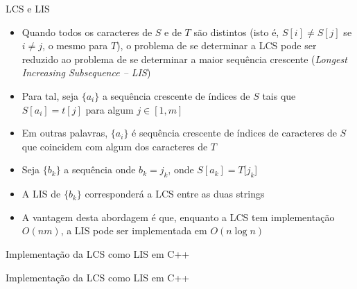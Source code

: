 \begin{frame}[fragile]{LCS e LIS}

    \begin{itemize}
        \item Quando todos os caracteres de $S$ e de $T$ são distintos (isto é, 
            $S[i] \neq S[j]$ se $i \neq j$, o mesmo para $T$), o problema de se determinar a LCS 
            pode ser reduzido ao problema de se determinar a maior sequência crescente 
            (\textit{Longest Increasing Subsequence -- LIS})

        \item Para tal, seja $\lbrace a_i\rbrace$ a sequência crescente de índices de $S$ tais que
            $S[a_i] = t[j]$ para algum $j\in [1,m]$

        \item Em outras palavras, $\lbrace a_i\rbrace$ é sequência crescente de índices de 
            caracteres de $S$ que coincidem com algum dos caracteres de $T$

        \item Seja $\lbrace b_k\rbrace$ a sequência onde $b_k = j_k$, onde $S[a_k] = T[j_k$] 

        \item A LIS de $\lbrace b_k\rbrace$ corresponderá a LCS entre as duas strings

        \item A vantagem desta abordagem é que, enquanto a LCS tem implementação $O(nm)$, a LIS 
            pode ser implementada em $O(n \log n)$

    \end{itemize}

\end{frame}



\begin{frame}[fragile]{Implementação da LCS como LIS em C++}
\end{frame}

\begin{frame}[fragile]{Implementação da LCS como LIS em C++}
\end{frame}
